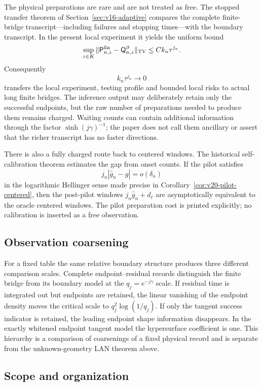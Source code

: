 The physical preparations are rare and are not treated as free.  The stopped
transfer theorem of Section~\ref{sec:v16-adaptive} compares the complete
finite-bridge transcript---including failures and stopping times---with the
boundary transcript.  In the present local experiment it yields the uniform
bound
\[
 \sup_{z\in K}
 \|\mathsf P_{n,z}^{\rm fin}-\mathsf Q_{n,z}^{\partial}\|_{\rm TV}
 \le Ck_n\tau^{j_n}.
\]
Consequently
\[
                  k_n\tau^{j_n}\longrightarrow0
\]
transfers the local experiment, testing profile and bounded local risks to
actual long finite bridges.  The inference output may deliberately retain
only the successful endpoints, but the raw number of preparations needed to
produce them remains charged.  Waiting counts can contain additional
information through the factor $\sinh(j\gamma)^{-1}$; the paper does not call
them ancillary or assert that the richer transcript has no faster directions.

There is also a fully charged route back to centered windows.  The historical
self-calibration theorem estimates the gap from onset counts.  If the pilot
satisfies
\[
 j_n|\widehat g_n-g|=o(\delta_n)
\]
in the logarithmic Hellinger sense made precise in
Corollary~\ref{cor:v20-pilot-centered}, then the post-pilot windows
$j_n\widehat g_n+d_\ell$ are asymptotically equivalent to the oracle centered
windows.  The pilot preparation cost is printed explicitly; no calibration
is inserted as a free observation.

\subsection{Observation coarsening}

For a fixed table the same relative boundary structure produces three
different comparison scales.  Complete endpoint--residual records distinguish
the finite bridge from its boundary model at the $q_j=e^{-j\gamma}$ scale.
If residual time is integrated out but endpoints are retained, the linear
vanishing of the endpoint density moves the critical scale to
$q_j^2\log(1/q_j)$.  If only the tangent success indicator is retained, the
leading endpoint shape information disappears.  In the exactly whitened
endpoint tangent model the hypersurface coefficient is one.  This hierarchy
is a comparison of coarsenings of a fixed physical record and is separate
from the unknown-geometry LAN theorem above.

\subsection{Scope and organization}

